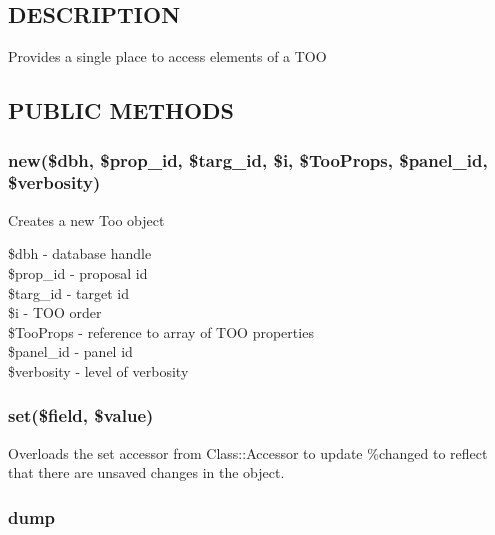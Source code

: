 \documentclass{article}
\begin{document}
\subsection*{DESCRIPTION\label{Too_DESCRIPTION}}


Provides a single place to access elements of a TOO

\subsection*{PUBLIC METHODS\label{Too_PUBLIC_METHODS}}
\subsubsection*{new(\$dbh, \$prop\_id, \$targ\_id, \$i, \$TooProps, \$panel\_id, \$verbosity)\label{Too_new_dbh_prop_id_targ_id_i_TooProps_panel_id_verbosity_}}


Creates a new Too object

\begin{description}

\item[{\$dbh - database handle}] \mbox{}
\item[{\$prop\_id - proposal id}] \mbox{}
\item[{\$targ\_id - target id}] \mbox{}
\item[{\$i - TOO order}] \mbox{}
\item[{\$TooProps - reference to array of TOO properties}] \mbox{}
\item[{\$panel\_id - panel id}] \mbox{}
\item[{\$verbosity - level of verbosity}] \mbox{}\end{description}
\subsubsection*{set(\$field, \$value)\label{Too_set_field_value_}}


Overloads the set accessor from Class::Accessor to update \%changed to
reflect that there are unsaved changes in the object.

\subsubsection*{dump\label{Too_dump}}
\end{document}

